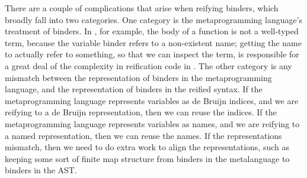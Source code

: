 There are a couple of complications that arise when reifying binders, which broadly fall into two categories.
One category is the metaprogramming language's treatment of binders.
In \Ltac, for example, the body of a function is not a well-typed term, because the variable binder refers to a non-existent name; getting the name to actually refer to something, so that we can inspect the term, is responsible for a great deal of the complexity in reification code in \Ltac.
The other category is any mismatch between the representation of binders in the metaprogramming language, and the representation of binders in the reified syntax.
If the metaprogramming language represents variables as de Bruijn indices, and we are reifying to a de Bruijn representation, then we can reuse the indices.
If the metaprogramming language represents variables as names, and we are reifying to a named representation, then we can reuse the names.
If the representations mismatch, then we need to do extra work to align the representations, such as keeping some sort of finite map structure from binders in the metalanguage to binders in the AST.




